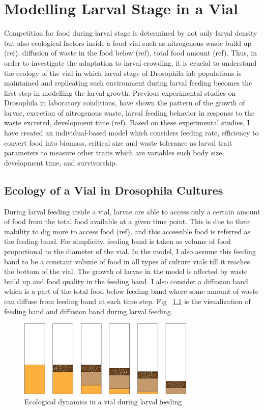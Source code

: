 \chapter{Modelling Larval Stage in a Vial}
 Competition for food during larval stage is determined by not only larval density but also ecological factors inside a food vial such as nitrogenous waste build up (ref), diffusion of waste in the food below (ref), total food amount (ref). Thus, in order to investigate the adaptation to larval crowding, it is crucial to understand the ecology of the vial in which larval stage of Drosophila lab populations is maintained and replicating such environment during larval feeding becomes the first step in modelling the larval growth. Previous experimental studies on Drosophila in laboratory conditions, have shown the pattern of the growth of larvae, excretion of nitrogenous waste, larval feeding behavior in response to the waste excreted, development time (ref). Based on these experimental studies, I have created an individual-based model which considers feeding rate, efficiency to convert food into biomass, critical size and waste tolerance as larval trait parameters to measure other traits which are variables such body size, development time, and survivorship.
\section{Ecology of a Vial in Drosophila Cultures}
During larval feeding inside a vial, larvae are able to access only a certain amount of food from the total food available at a given time point. This is due to their inability to dig more to access food (ref), and this accessible food is referred as the feeding band. For simplicity, feeding band is taken as volume of food proportional to the diameter of the vial. In the model, I also assume this feeding band to be a constant volume of food in all types of culture vials till it reaches the bottom of the vial. The growth of larvae in the model is affected by waste build up and food quality in the feeding band. I also consider a diffusion band which is a part of the total food below feeding band where some amount of waste can diffuse from feeding band at each time step. Fig ~\ref{fig:vial} is the visualization of feeding band and diffusion band during larval feeding.

\begin{figure}[h]
  \centering
  \includegraphics[width=0.75\textwidth]{C2/Figs/vial_diagram}
  \caption{Ecological dynamics in a vial during larval feeding}
  \label{fig:vial}
\end{figure}

